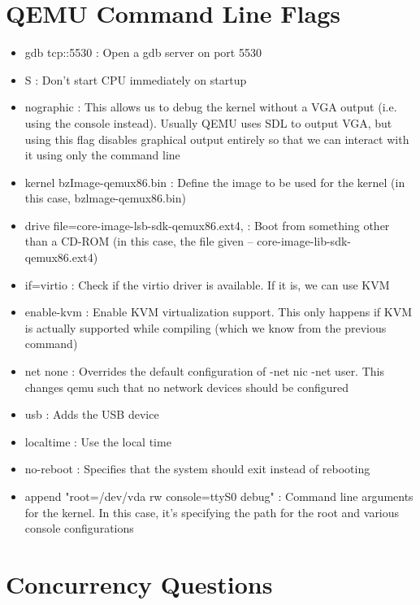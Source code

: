 \documentclass[letterpaper,10pt]{article}
\begin{document}
\section{QEMU Command Line Flags}

\begin{itemize}
   \item gdb tcp::5530 : Open a gdb server on port 5530
   \item S : Don’t start CPU immediately on startup
   \item nographic : This allows us to debug the kernel without a VGA output (i.e. using the console instead). Usually QEMU uses SDL to output VGA, but using this flag disables graphical output entirely so that we can interact with it using only the command line
   \item kernel bzImage-qemux86.bin : Define the image to be used for the kernel (in this case,  bzlmage-qemux86.bin)
   \item drive file=core-image-lsb-sdk-qemux86.ext4, : Boot from something other than a CD-ROM (in this case, the file given – core-image-lib-sdk-qemux86.ext4)
   \item if=virtio : Check if the virtio driver is available. If it is, we can use KVM
   \item enable-kvm :  Enable KVM virtualization support. This only happens if KVM is actually supported while compiling (which we know from the previous command)
   \item net none : Overrides the default configuration of -net nic -net user. This changes qemu such that no network devices should be configured
   \item usb : Adds the USB device
   \item localtime : Use the local time
   \item no-reboot : Specifies that the system should exit instead of rebooting
   \item append "root=/dev/vda rw console=ttyS0 debug" : Command line arguments for the kernel. In this case, it’s specifying the path for the root and various console configurations
\end{itemize}


\section{Concurrency Questions}
\end{document}
